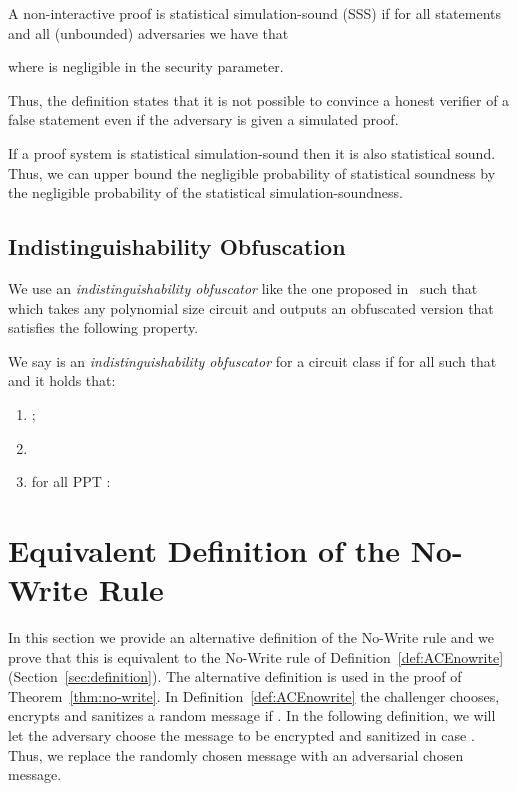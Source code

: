 \documentclass{llncs}
\begin{document}
\begin{defi}A non-interactive proof  is statistical simulation-sound (SSS) if for all statements  and all (unbounded) adversaries  we have that
	
	where  is negligible in the security parameter.
\end{defi}

Thus, the definition states that it is not possible to convince a honest verifier of a false statement even if the adversary is given a simulated proof.


\begin{remark}
If a proof system is statistical simulation-sound then it is also statistical sound. Thus, we can upper bound the negligible probability of statistical soundness by the negligible probability of the statistical simulation-soundness. 
\end{remark}
\subsection{Indistinguishability Obfuscation}
\newcommand{\Obf}{iO}
\newcommand{\Circs}{\mathcal{C}}
\newcommand{\obf}[1]{\bar{#1}}
\newcommand{\poly}{\mathsf{poly}}
\newcommand{\Adv}{\mathcal{A}}


We use an \emph{indistinguishability obfuscator} like the one proposed in~\cite{DBLP:conf/focs/GargGH0SW13} such that  which takes any polynomial size circuit  and outputs an obfuscated version  that satisfies the following property.
\begin{defi} \label{def:io} We say  is an \emph{indistinguishability obfuscator} for a circuit class  if for all  such that  and  it holds that:
\begin{enumerate}
\item ;
\item   
\item  for all PPT :

\end{enumerate}
\end{defi}








\section{Equivalent Definition of the No-Write Rule}
In this section we provide an alternative definition of the No-Write rule and we prove that this is equivalent to the No-Write rule of Definition~\ref{def:ACEnowrite} (Section~\ref{sec:definition}). The alternative definition is used in the proof of Theorem~\ref{thm:no-write}.
In Definition~\ref{def:ACEnowrite} the challenger chooses, encrypts and sanitizes a random message if . In the following definition, we will let the adversary choose the message to be encrypted and sanitized in case . Thus, we replace the randomly chosen message with an adversarial chosen message.
\end{document}
